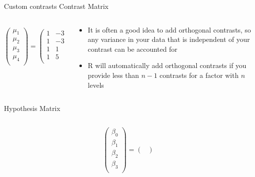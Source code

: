 \documentclass[aspectratio=169]{beamer}
\begin{document}
\begin{frame}{Custom contrasts}
  \footnotesize
  Contrast Matrix
  \begin{columns}
    \begin{column}[t]{.5\textwidth}
\[
  \begin{pmatrix}
    \mu_1 \\
    \mu_2 \\
    \mu_3 \\
    \mu_4 \\
  \end{pmatrix} = 
  \begin{pmatrix}
  1 & -3 & -0.511 & -0.533 \\ 
  1 & -3 &  0.131 &  0.727 \\ 
  1 &  1 &  0.760 & -0.387 \\ 
  1 &  5 & -0.380 &  0.194 \\ 
  \end{pmatrix} \cdot
  \begin{pmatrix}
    \beta_0 \\
    \beta_1 \\
    \beta_2 \\
    \beta_3
  \end{pmatrix}
\]
    \end{column}
    \begin{column}[t]{.5\textwidth}
      \begin{itemize}
        \item It is often a good idea to add orthogonal contrasts, so any
          variance in your data that is independent of your contrast can be
          accounted for
        \item R will automatically add orthogonal contrasts if you provide less
          than $n - 1$ contrasts for a factor with $n$ levels
      \end{itemize}
    \end{column}
  \end{columns}
  Hypothesis Matrix
  \begin{columns}
    \begin{column}[t]{.5\textwidth}
\[
  \begin{pmatrix}
    \beta_0 \\
    \beta_1 \\
    \beta_2 \\
    \beta_3 \\
  \end{pmatrix} = 
  \begin{pmatrix}

\end{pmatrix}\]
\end{column}
\end{columns}
\end{frame}
\end{document}
